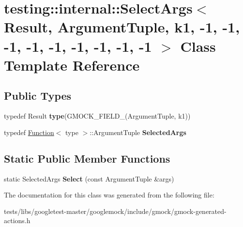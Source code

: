 \hypertarget{classtesting_1_1internal_1_1SelectArgs_3_01Result_00_01ArgumentTuple_00_01k1_00_01-1_00_01-1_00_6a5fc7802a60cf36c89bd10623cc9552}{}\section{testing\+:\+:internal\+:\+:Select\+Args$<$ Result, Argument\+Tuple, k1, -\/1, -\/1, -\/1, -\/1, -\/1, -\/1, -\/1, -\/1, -\/1 $>$ Class Template Reference}
\label{classtesting_1_1internal_1_1SelectArgs_3_01Result_00_01ArgumentTuple_00_01k1_00_01-1_00_01-1_00_6a5fc7802a60cf36c89bd10623cc9552}
\subsection*{Public Types}
\begin{DoxyCompactItemize}
\item 
\mbox{\label{classtesting_1_1internal_1_1SelectArgs_3_01Result_00_01ArgumentTuple_00_01k1_00_01-1_00_01-1_00_6a5fc7802a60cf36c89bd10623cc9552_af1aee025a91b513b1d90a200748377dc}} 
typedef Result {\bfseries type}(G\+M\+O\+C\+K\+\_\+\+F\+I\+E\+L\+D\+\_\+(Argument\+Tuple, k1))
\item 
\mbox{\label{classtesting_1_1internal_1_1SelectArgs_3_01Result_00_01ArgumentTuple_00_01k1_00_01-1_00_01-1_00_6a5fc7802a60cf36c89bd10623cc9552_a40e5cbd362d7bdd16d0d60a39b7e5c14}} 
typedef \hyperlink{structtesting_1_1internal_1_1Function}{Function}$<$ type $>$\+::Argument\+Tuple {\bfseries Selected\+Args}
\end{DoxyCompactItemize}
\subsection*{Static Public Member Functions}
\begin{DoxyCompactItemize}
\item 
\mbox{\label{classtesting_1_1internal_1_1SelectArgs_3_01Result_00_01ArgumentTuple_00_01k1_00_01-1_00_01-1_00_6a5fc7802a60cf36c89bd10623cc9552_a7aaf6f5192da4e05fbc2bf595418546b}} 
static Selected\+Args {\bfseries Select} (const Argument\+Tuple \&args)
\end{DoxyCompactItemize}


The documentation for this class was generated from the following file\+:\begin{DoxyCompactItemize}
\item 
tests/libs/googletest-\/master/googlemock/include/gmock/gmock-\/generated-\/actions.\+h\end{DoxyCompactItemize}
